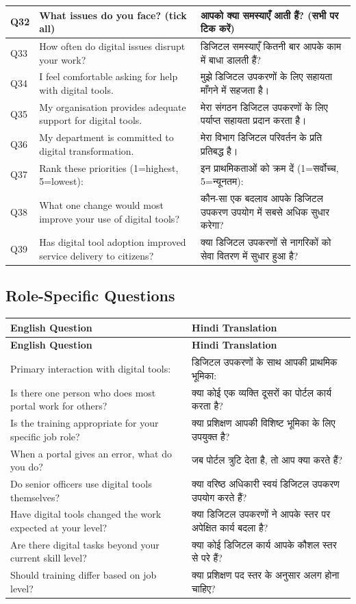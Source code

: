 \documentclass[11pt,a4paper]{article}
\begin{document}
\begin{longtable}{|p{1cm}|p{6cm}|p{6cm}|}
Q32 & What issues do you face? (tick all) & आपको क्या समस्याएँ आती हैं? (सभी पर टिक करें) \\ \hline
Q33 & How often do digital issues disrupt your work? & डिजिटल समस्याएँ कितनी बार आपके काम में बाधा डालती हैं? \\ \hline
Q34 & I feel comfortable asking for help with digital tools. & मुझे डिजिटल उपकरणों के लिए सहायता माँगने में सहजता है। \\ \hline
Q35 & My organisation provides adequate support for digital tools. & मेरा संगठन डिजिटल उपकरणों के लिए पर्याप्त सहायता प्रदान करता है। \\ \hline
Q36 & My department is committed to digital transformation. & मेरा विभाग डिजिटल परिवर्तन के प्रति प्रतिबद्ध है। \\ \hline
Q37 & Rank these priorities (1=highest, 5=lowest): & इन प्राथमिकताओं को क्रम दें (1=सर्वोच्च, 5=न्यूनतम): \\ \hline
Q38 & What one change would most improve your use of digital tools? & कौन-सा एक बदलाव आपके डिजिटल उपकरण उपयोग में सबसे अधिक सुधार करेगा? \\ \hline
Q39 & Has digital tool adoption improved service delivery to citizens? & क्या डिजिटल उपकरणों से नागरिकों को सेवा वितरण में सुधार हुआ है? \\ \hline
\end{longtable}

\subsection{Role-Specific Questions}
\begin{longtable}{|p{6cm}|p{6cm}|}
\hline
\textbf{English Question} & \textbf{Hindi Translation} \\ \hline
\endfirsthead
\hline
\textbf{English Question} & \textbf{Hindi Translation} \\ \hline
\endhead
\hline
\endfoot
\hline
\endlastfoot
Primary interaction with digital tools: & डिजिटल उपकरणों के साथ आपकी प्राथमिक भूमिका: \\ \hline
Is there one person who does most portal work for others? & क्या कोई एक व्यक्ति दूसरों का पोर्टल कार्य करता है? \\ \hline
Is the training appropriate for your specific job role? & क्या प्रशिक्षण आपकी विशिष्ट भूमिका के लिए उपयुक्त है? \\ \hline
When a portal gives an error, what do you do? & जब पोर्टल त्रुटि देता है, तो आप क्या करते हैं? \\ \hline
Do senior officers use digital tools themselves? & क्या वरिष्ठ अधिकारी स्वयं डिजिटल उपकरण उपयोग करते हैं? \\ \hline
Have digital tools changed the work expected at your level? & क्या डिजिटल उपकरणों ने आपके स्तर पर अपेक्षित कार्य बदला है? \\ \hline
Are there digital tasks beyond your current skill level? & क्या कोई डिजिटल कार्य आपके कौशल स्तर से परे हैं? \\ \hline
Should training differ based on job level? & क्या प्रशिक्षण पद स्तर के अनुसार अलग होना चाहिए? \\ \hline
\end{longtable}
\end{document}
